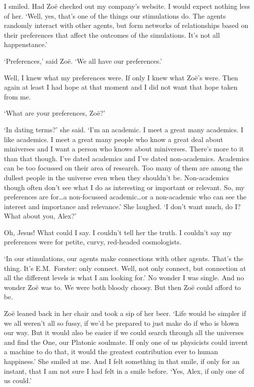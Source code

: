 I smiled. Had Zo{\"e} checked out my company's website. I would
expect nothing less of her. `Well, yes, that's one of the things our
stimulations do. The agents randomly interact with other agents, but
form networks of relationships based on their preferences that
affect the outcomes of the simulations. It's not all happenstance.'

`Preferences,' said Zo{\"e}. `We all have our preferences.'

Well, I knew what my preferences were. If only I knew what Zo{\"e}'s
were. Then again at least I had hope at that moment and I did not
want that hope taken from me.

`What are your preferences, Zo{\"e}?'

`In dating terms?' she said. `I'm an academic. I meet a great many
academics. I like academics. I meet a great many people who know a
great deal about miniverses and I want a person who knows about
miniverses. There's more to it than that though. I've dated
academics and I've dated non-academics. Academics can be too
focussed on their area of research. Too many of them are among the
dullest people in the universe even when they shouldn't be. Non-academics though often don't see
what I do as interesting or important or relevant. So, my
preferences are for\dots a non-focussed academic\dots or a non-academic
who can see the interest and importance and relevance.' She laughed.
`I don't want much, do I? What about you, Alex?'

Oh, Jesus! What could I say. I couldn't tell her the truth. I
couldn't say my preferences were for petite, curvy, red-headed
cosmologists.

`In our stimulations, our agents make connections with other agents.
That's the thing. It's E.M.~Forster: only connect. Well, not
{\twelveit only\/} connect, but connection at all the different
levels is what I am looking for.' No wonder I was single. And no
wonder Zo{\"e} was to. We were both bloody choosy. But then Zo{\"e}
could afford to be.

Zo{\"e} leaned back in her chair and took a sip of her beer. `Life
would be simpler if we all weren't all so fussy, if we'd be prepared
to just make do if who is blown our way. But it would also be easier
if we could search through all the universes and find the One, our
Platonic soulmate. If only one of us physicists could invent a
machine to do that, it would the greatest contribution ever to human
happiness.' She smiled at me. And I felt something in that smile, if
only for an instant, that I am not sure I had felt in a smile
before. `Yes, Alex, if only one of us could.'

